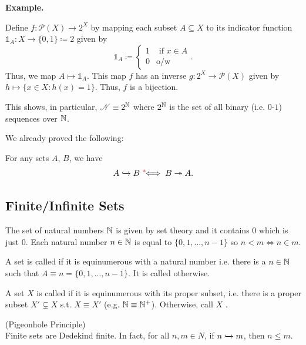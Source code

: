 \documentclass[14pt,oneside]{extarticle}
\newenvironment{example}{
    \par
    \vspace{5pt}
    \noindent\textbf{Example.}
    \begin{tcolorbox}[
        blanker, breakable, left=5mm, parbox=false,
        before upper={\parindent15pt},
        after skip=10pt,
        borderline west={1mm}{0pt}{solarized-magenta!50}]
}{
    \end{tcolorbox}
    \vspace{5pt}
}
\begin{document}
\begin{example}
\begin{enumerate}[label=$\circ$, leftmargin=*, itemsep=1em]
    \indent\soln Define $f: \mathscr{P}(X) \to 2^X$ by mapping each subset $A \subseteq X$ to its indicator function $\mathds{1}_A: X \to \{0,1\} \coloneqq 2$ given by 
    \[\mathds{1}_A \coloneqq \begin{cases}
      1 & \text{ if } x \in A \\
      0 & \text{o/w}
    \end{cases}.\]
    Thus, we map $A \mapsto \mathds{1}_A$. This map $f$ has an inverse $g: 2^X \to \mathscr{P}(X)$ given by $h \mapsto \{x \in X: h(x) = 1\}$. Thus, $f$ is a bijection.

    This shows, in particular, $\mathscr{N} \equiv 2^{\mathbb{N}}$ where $2^{\mathbb{N}}$ is the set of all binary (i.e. $0$-$1$) sequences over $\mathbb{N}$.
  \end{enumerate}
\end{example}

We already proved the following:

\begin{proposition*}
  For any sets $A$, $B$, we have 
  \[ A \xhookrightarrow{} B \text{ }\textcolor{red}{^*} \! \! \! \! \iff B \twoheadrightarrow{} A.\]
\end{proposition*}

\subsection{Finite/Infinite Sets}
The set of natural numbers $\mathbb{N}$ is given by set theory and it contains $0$ which is just $0$. Each natural number $n \in \mathbb{N}$ is equal to $\{0,1, \dots, n-1\}$ so $n < m \iff n \in m$.

\begin{definition*}
  A set is called  if it is equinumerous with a natural number i.e. there is a $n \in \mathbb{N}$ such that $A \equiv n = \{0,1, \dots, n-1\}$. It is called  otherwise.
\end{definition*}

\begin{definition*}
  A set $X$ is called  if it is equinumerous with its proper subset, i.e. there is a proper subset $X' \subsetneq X$ s.t. $X \equiv X'$ (e.g. $\mathbb{N} \equiv \mathbb{N}^+$). Otherwise, call $X$ .
\end{definition*}

\begin{proposition*} (Pigeonhole Principle) \\
  Finite sets are Dedekind finite. In fact, for all $n, m \in N$, if $n \xhookrightarrow{} m$, then $n \leq m$.
  
\end{proposition*}
\end{document}
